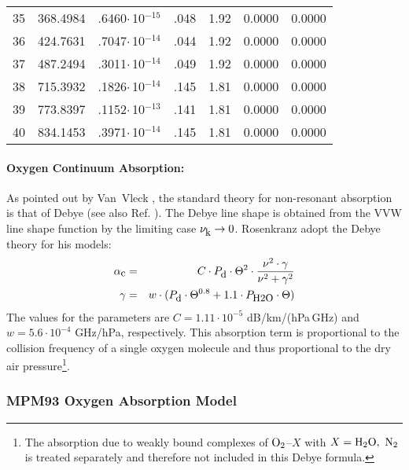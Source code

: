 \begin{longtable}{lrrrrrr}
35 & 368.4984 & .6460$\cdot$\,10$^{-15}$ & .048 & 1.92 & 0.0000 & 0.0000 \\
36 & 424.7631 & .7047$\cdot$\,10$^{-14}$ & .044 & 1.92 & 0.0000 & 0.0000 \\
37 & 487.2494 & .3011$\cdot$\,10$^{-14}$ & .049 & 1.92 & 0.0000 & 0.0000 \\
38 & 715.3932 & .1826$\cdot$\,10$^{-14}$ & .145 & 1.81 & 0.0000 & 0.0000 \\
39 & 773.8397 & .1152$\cdot$\,10$^{-13}$ & .141 & 1.81 & 0.0000 & 0.0000 \\
40 & 834.1453 &  .3971$\cdot$\,10$^{-14}$ & .145 & 1.81 & 0.0000 & 0.0000 \\
\end{longtable}

\paragraph{Oxygen Continuum Absorption:}
\label{levele:pwr98_o2cont}
As pointed out by Van~Vleck \citep{vv:87}, the standard theory for
non-resonant absorption is that of Debye (see also Ref. \citet{townes:55}). 
The Debye line shape is obtained from the VVW line shape function by
the limiting case $\nu_{\mbox{\rm \small k}} \rightarrow 0$.
Rosenkranz \citet{pwr:93} adopt the Debye theory for his models: 
\begin{eqnarray}
  \label{eq:pwr_o2cont}
  \alphac &=&  C \cdot \pda \cdot \Theta^2 \cdot 
             \frac{\nu^2 \cdot \gamma}{\nu^2+\gamma^2}\\
%
  \label{eq:pwr_o2cont_1}
  \gamma &=&  w \cdot (\pda \cdot \Theta^{0.8} + 1.1 \cdot \phzo \cdot
  \Theta)
\end{eqnarray}
The values for the parameters are $C = 1.11\cdot 10^{-5}$ dB/km/(hPa\,GHz) and 
$w = 5.6 \cdot 10^{-4}$ GHz/hPa, respectively. This absorption
term is proportional to the collision frequency of a single oxygen molecule
and thus proportional to the dry air pressure\footnote{The absorption
  due to weakly bound complexes of $\mbox{O}_2$--$X$ with $X=\mbox{H}_2\mbox{O},~\mbox{N}_2$ is 
  treated separately and therefore not included in this Debye
  formula.}.






\subsubsection{MPM93 Oxygen Absorption Model}
\label{levelb:O2_mpm93}


